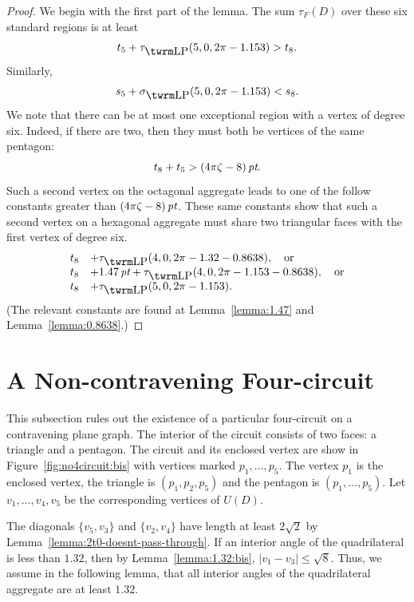 \begin{proof}
We begin with the first part of the lemma. The sum  $\tau_F(D)$
over these six standard regions is at least
    $$t_5+\tauLP(5,0,2\pi-1.153)> t_8.$$
Similarly,
    $$s_5+\sLP(5,0,2\pi-1.153)<s_8.$$
%
We note that there can be at most one exceptional region with a
vertex of degree six.  Indeed, if there are two, then they must
both be vertices of the same pentagon:
    $$t_8+t_5>(4\pi\zeta-8)\,\hbox{\it pt}.$$
Such a second vertex on the octagonal aggregate leads to one of
the follow constants greater than $(4\pi\zeta-8)\,\hbox{\it pt}$.  These same
constants show that such a second vertex on a hexagonal aggregate
must share two triangular faces with the first vertex of degree
six.
$$\begin{array}{lll}
    t_8 &+\tauLP(4,0,2\pi-1.32-0.8638),\quad\text{or}\\
    t_8 &+1.47\,\pt+\tauLP(4,0,2\pi-1.153-0.8638),\quad\text{or}\\
    t_8 &+\tauLP(5,0,2\pi-1.153) .
\end{array}
$$
(The relevant constants are found at Lemma~\ref{lemma:1.47} and
Lemma~\ref{lemma:0.8638}.)

\end{proof}

\section{A Non-contravening Four-circuit}
\label{sec:impossible}

This subsection rules out the existence of a particular
four-circuit on a contravening plane graph.  The interior of the
circuit consists of two faces: a triangle and a pentagon.  The
circuit and its enclosed vertex are show in
Figure~\ref{fig:no4circuit:bis} with vertices marked
$p_1,\ldots,p_5$. The vertex $p_1$ is the enclosed vertex, the
triangle is $(p_1,p_2,p_5)$ and the pentagon is
$(p_1,\ldots,p_5)$.  Let $v_1,\ldots,v_4,v_5$ be the corresponding
vertices of $U(D)$.

The diagonals $\{v_5,v_3\}$ and $\{v_2,v_4\}$ have length at least
$2\sqrt2$ by Lemma~\ref{lemma:2t0-doesnt-pass-through}.  If an
interior angle of the  quadrilateral is less than $1.32$, then by
Lemma~\ref{lemma:1.32:bis},  $|v_1-v_3|\le\sqrt{8}$.  Thus, we
assume in the following lemma, that all interior angles of the
quadrilateral aggregate are at least $1.32$.

